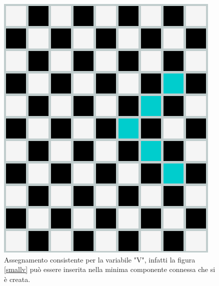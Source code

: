 \begin{figure}[h]
	\centering
	\includegraphics[scale=0.25]{immagini/goodCC}
	\caption{Assegnamento consistente per la variabile "V", infatti la figura \ref{smallv} può essere inserita nella minima componente connessa che si è creata.}
	\label{fig:CCC}
\end{figure}

